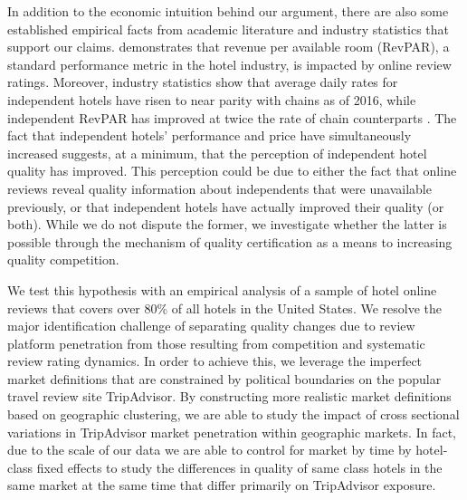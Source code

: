 \documentclass[mksc,blindrev]{informs3} %
\begin{document}
In addition to the economic intuition behind our argument, there are also some established empirical facts from academic literature and industry statistics that support our claims.  demonstrates that revenue per available room (RevPAR), a standard performance metric in the hotel industry, is impacted by online review ratings. Moreover, industry statistics show that average daily rates for independent hotels have risen to near parity with chains as of 2016, while independent RevPAR has improved at twice the rate of chain counterparts \citep{lodging2017}. The fact that independent hotels' performance and price have simultaneously increased suggests, at a minimum, that the perception of independent hotel quality has improved. This perception could be due to either the fact that online reviews reveal quality information about independents that were unavailable previously, or that independent hotels have actually improved their quality (or both). While we do not dispute the former, we investigate whether the latter is possible through the mechanism of quality certification as a means to increasing quality competition.

We test this hypothesis with an empirical analysis of a sample of hotel online reviews that covers over 80\% of all hotels in the United States. We resolve the major identification challenge of separating quality changes due to review platform penetration from those resulting from competition and systematic review rating dynamics. In order to achieve this, we leverage the imperfect market definitions that are constrained by political boundaries on the popular travel review site TripAdvisor. By constructing more realistic market definitions based on geographic clustering, we are able to study the impact of cross sectional variations in TripAdvisor market penetration within geographic markets. In fact, due to the scale of our data we are able to control for market by time by hotel-class fixed effects to study the differences in quality of same class hotels in the same market at the same time that differ primarily on TripAdvisor exposure.

\end{document}
